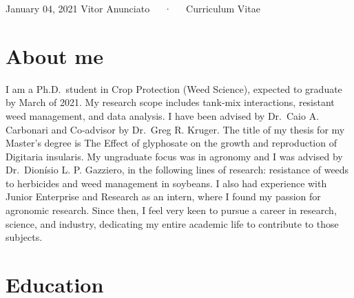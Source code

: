 \documentclass[11pt, a4paper]{awesome-cv}
\begin{document}
\makecvheader

\makecvfooter
  {January 04, 2021}
    {Vitor Anunciato~~~·~~~Curriculum Vitae}
  {\thepage}





\hypertarget{about-me}{%
\section{About me}\label{about-me}}

I am a Ph.D.~student in Crop Protection (Weed Science), expected to
graduate by March of 2021. My research scope includes tank‑mix
interactions, resistant weed management, and data analysis. I have been
advised by Dr.~Caio A. Carbonari and Co‑advisor by Dr.~Greg R. Kruger.
The title of my thesis for my Master's degree is The Effect of
glyphosate on the growth and reproduction of Digitaria insularis. My
ungraduate focus was in agronomy and I was advised by Dr.~Dionísio L. P.
Gazziero, in the following lines of research: resistance of weeds to
herbicides and weed management in soybeans. I also had experience with
Junior Enterprise and Research as an intern, where I found my passion
for agronomic research. Since then, I feel very keen to pursue a career
in research, science, and industry, dedicating my entire academic life
to contribute to those subjects.

\hypertarget{education}{%
\section{Education}\label{education}}
\end{document}
